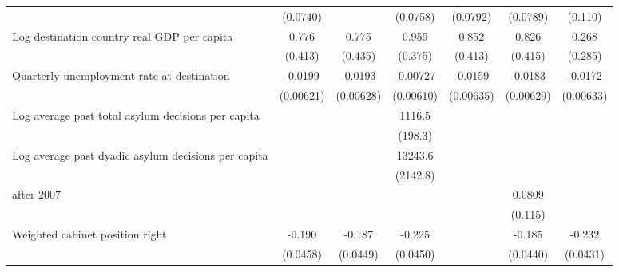 \begin{table}[htbp]
\begin{tabular}{l*{6}{c}}
                    &    (0.0740)         &                     &    (0.0758)         &    (0.0792)         &    (0.0789)         &     (0.110)         \\
[1em]
Log destination country real GDP per capita&       0.776         &       0.775         &       0.959\sym{*}  &       0.852\sym{*}  &       0.826         &       0.268         \\
                    &     (0.413)         &     (0.435)         &     (0.375)         &     (0.413)         &     (0.415)         &     (0.285)         \\
[1em]
Quarterly unemployment rate at destination&     -0.0199\sym{**} &     -0.0193\sym{**} &    -0.00727         &     -0.0159\sym{*}  &     -0.0183\sym{**} &     -0.0172\sym{**} \\
                    &   (0.00621)         &   (0.00628)         &   (0.00610)         &   (0.00635)         &   (0.00629)         &   (0.00633)         \\
[1em]
Log average past total asylum decisions per capita&                     &                     &      1116.5\sym{***}&                     &                     &                     \\
                    &                     &                     &     (198.3)         &                     &                     &                     \\
[1em]
Log average past dyadic asylum decisions per capita&                     &                     &     13243.6\sym{***}&                     &                     &                     \\
                    &                     &                     &    (2142.8)         &                     &                     &                     \\
[1em]
after 2007          &                     &                     &                     &                     &      0.0809         &                     \\
                    &                     &                     &                     &                     &     (0.115)         &                     \\
[1em]
Weighted cabinet position right&      -0.190\sym{***}&      -0.187\sym{***}&      -0.225\sym{***}&                     &      -0.185\sym{***}&      -0.232\sym{***}\\
                    &    (0.0458)         &    (0.0449)         &    (0.0450)         &                     &    (0.0440)         &    (0.0431)         \\

\end{tabular}
\end{table}
